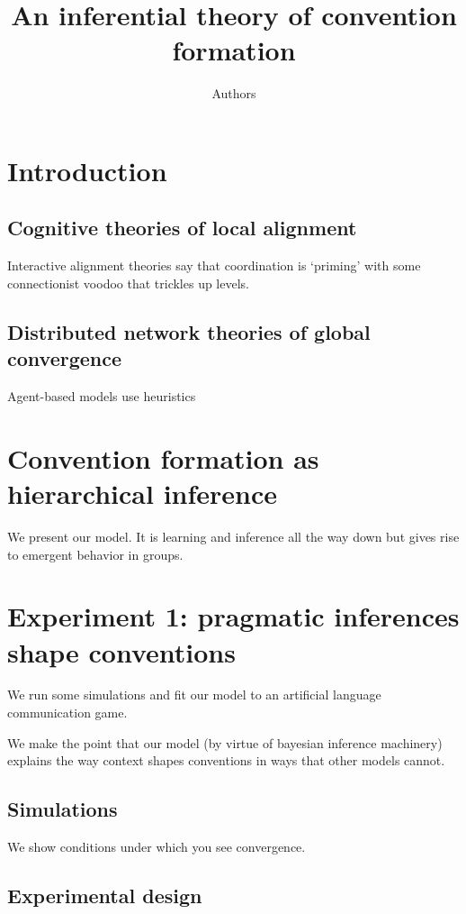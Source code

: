 \documentclass[11pt, floatsintext]{apa6}
\title{An inferential theory of convention formation}
\author{Authors}
\affiliation{Universities}
\begin{document}
\maketitle

\section{Introduction}

\subsection{Cognitive theories of local alignment}

Interactive alignment theories say that coordination is `priming' with some connectionist voodoo that trickles up levels. 

\subsection{Distributed network theories of global convergence}

Agent-based models use heuristics 

\section{Convention formation as hierarchical inference}

We present our model. It is learning and inference all the way down but gives rise to emergent behavior in groups.

\section{Experiment 1: pragmatic inferences shape conventions}

We run some simulations and fit our model to an artificial language communication game. 

We make the point that our model (by virtue of bayesian inference machinery) explains the way context shapes conventions in ways that other models cannot.

\subsection{Simulations}

We show conditions under which you see convergence. 

\subsection{Experimental design}
\end{document}
